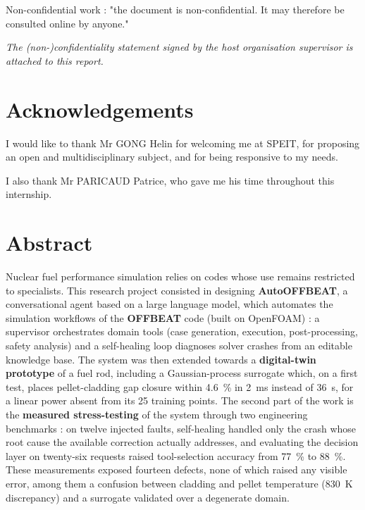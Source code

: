 \documentclass[12pt,a4paper]{report}
\newcommand{\hostOrganisation}{SPEIT}
\newcommand{\enstaSupervisor}{PARICAUD Patrice}
\newcommand{\hostSupervisor}{GONG Helin}
\begin{document}
\noindent
Non-confidential work : "the document is non-confidential. It may therefore be
consulted online by anyone."

\vspace{2cm}

\noindent\textit{The (non-)confidentiality statement signed by the host
organisation supervisor is attached to this report.}

\clearpage

\thispagestyle{empty}
\chapter*{Acknowledgements}

\vspace{0.5cm}

\noindent
I would like to thank Mr \hostSupervisor{} for welcoming me at
\hostOrganisation{}, for proposing an open and multidisciplinary subject, and
for being responsive to my needs.

I also thank Mr \enstaSupervisor{}, who gave me his time throughout this
internship.

\clearpage

\chapter*{Abstract}

\noindent
Nuclear fuel performance simulation relies on codes whose use remains
restricted to specialists. This research project consisted in designing
\textbf{AutoOFFBEAT}, a conversational agent based on a large language model,
which automates the simulation workflows of the \textbf{OFFBEAT} code (built on
OpenFOAM) : a supervisor orchestrates domain tools (case generation, execution,
post-processing, safety analysis) and a self-healing loop diagnoses solver
crashes from an editable knowledge base. The system was then extended towards a
\textbf{digital-twin prototype} of a fuel rod, including a Gaussian-process
surrogate which, on a first test, places pellet-cladding gap closure within
\SI{4.6}{\percent} in \SI{2}{\milli\second} instead of \SI{36}{\second},
for a linear power absent from its \num{25} training points. The second part of
the work is the \textbf{measured stress-testing} of the system through two
engineering benchmarks : on twelve injected faults, self-healing handled only
the crash whose root cause the available correction actually addresses, and
evaluating the decision layer on twenty-six requests raised tool-selection
accuracy from \SI{77}{\percent} to \SI{88}{\percent}. These measurements exposed
fourteen defects, none of which raised any visible error, among them a confusion
between cladding and pellet temperature (\SI{830}{\kelvin} discrepancy) and a
surrogate validated over a degenerate domain.
\end{document}

